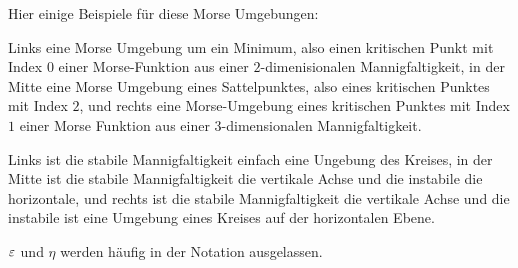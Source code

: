 \begin{definition}
    Hier einige Beispiele für diese Morse Umgebungen:


    Links eine Morse Umgebung um ein Minimum, also einen kritischen Punkt mit Index $0$ einer 
    Morse-Funktion aus einer $2$-dimenisionalen Mannigfaltigkeit, in der Mitte eine Morse Umgebung 
    eines Sattelpunktes, also eines kritischen Punktes mit Index $2$, und rechts eine Morse-Umgebung 
    eines kritischen Punktes mit Index $1$ einer Morse Funktion aus einer $3$-dimensionalen 
    Mannigfaltigkeit.

    Links ist die stabile Mannigfaltigkeit einfach eine Ungebung des Kreises, in der Mitte ist die 
    stabile Mannigfaltigkeit die vertikale Achse und die instabile die horizontale, und rechts
    ist die stabile Mannigfaltigkeit die vertikale Achse und die instabile ist eine Umgebung 
    eines Kreises auf der horizontalen Ebene.
    
    $\varepsilon$ und $\eta$ werden häufig in der Notation ausgelassen.
\end{definition}

